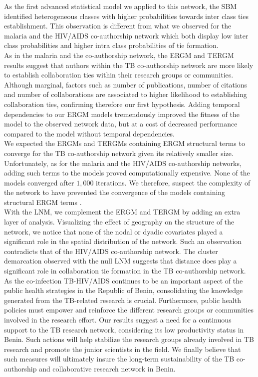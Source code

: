 As the first advanced statistical model we applied to this network, the SBM identified heterogeneous classes with higher probabilities towards inter class ties establishment. This observation is different from what we observed for the malaria and the HIV/AIDS co-authorship network which both display low inter class probabilities and higher intra class probabilities of tie formation. \\
As in the malaria and the co-authorship network, the ERGM and TERGM results suggest that authors within the TB co-authorship network are more likely to establish collaboration ties within their research groups or communities. Although marginal, factors such as number of publications, number of citations and number of collaborations are associated to higher likelihood to establishing collaboration ties, confirming therefore our first hypothesis. Adding temporal dependencies to our ERGM models tremendously improved the fitness of the model to the observed network data, but at a cost of decreased performance compared to the model without temporal dependencies.\\
We expected the ERGMs and TERGMs containing ERGM structural terms to converge for the TB co-authorship network given its relatively smaller size. Unfortunately, as for the malaria and the HIV/AIDS co-authorship networks, adding such terms to the models proved computationally expensive. None of the models converged after $1,000$ iterations. We therefore, suspect the complexity of the network to have prevented the convergence of the models containing structural ERGM terms \cite{schmid_exponential_2017}. \\ 
With the LNM, we complement the ERGM and TERGM by adding an extra layer of analysis. Visualizing the effect of geography on the structure of the network, we notice that none of the nodal or dyadic covariates played a significant role in the spatial distribution of the network. Such an observation contradicts that of the HIV/AIDS co-authorship network. The cluster demarcation observed with the null LNM suggests that distance does play a significant role in collaboration tie formation in the TB co-authorship network. \\
As the co-infection TB-HIV/AIDS continues to be an important aspect of the public health strategies in the Republic of Benin, consolidating the knowledge generated from the TB-related research is crucial. Furthermore, public health policies must empower and reinforce the different research groups or communities involved in the research effort. Our results suggest a need for a continuous support to the TB research network, considering its low productivity status in Benin. Such actions will help stabilize the research groups already involved in TB research and promote the junior scientists in the field. We finally believe that such measures will ultimately insure the long-term sustainability of the TB co-authorship and collaborative research network in Benin.

